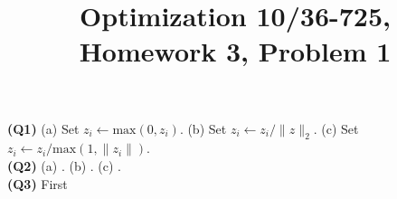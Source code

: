 \documentclass{article}
\title{Optimization 10/36-725, 
        Homework 3, Problem 1}
\author{}
\date{}
\begin{document}
\maketitle
\vspace{-6mm}

\textbf{(Q1)}
(a) Set $z_i \leftarrow \text{max}(0,z_i)$. 
(b) Set $z_i \leftarrow z_i/\|z\|_2$. 
(c) Set $z_i \leftarrow z_i/\text{max}(1,\|z_i\|)$.
\\

\textbf{(Q2)}
(a) .
(b) .
(c) .
\\

\textbf{(Q3)} First \\
\end{document}
